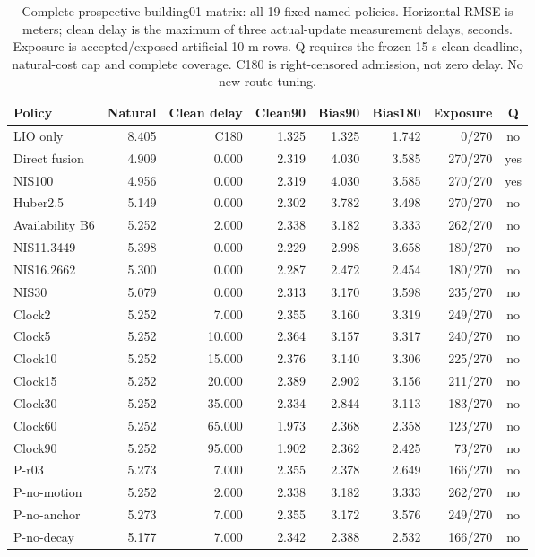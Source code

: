 \begin{table}[t]\centering\small
\caption{Complete prospective building01 matrix: all 19 fixed named policies. Horizontal RMSE is meters; clean delay is the maximum of three actual-update measurement delays, seconds. Exposure is accepted/exposed artificial 10-m rows. Q requires the frozen 15-s clean deadline, natural-cost cap and complete coverage. C180 is right-censored admission, not zero delay. No new-route tuning.}\label{tab:primary}
\begin{tabular}{lrrrrrrc}\toprule
Policy & Natural & Clean delay & Clean90 & Bias90 & Bias180 & Exposure & Q\\\midrule
LIO only & 8.405 & C180 & 1.325 & 1.325 & 1.742 & 0/270 & no \\
Direct fusion & 4.909 & 0.000 & 2.319 & 4.030 & 3.585 & 270/270 & yes \\
NIS100 & 4.956 & 0.000 & 2.319 & 4.030 & 3.585 & 270/270 & yes \\
Huber2.5 & 5.149 & 0.000 & 2.302 & 3.782 & 3.498 & 270/270 & no \\
Availability B6 & 5.252 & 2.000 & 2.338 & 3.182 & 3.333 & 262/270 & no \\
NIS11.3449 & 5.398 & 0.000 & 2.229 & 2.998 & 3.658 & 180/270 & no \\
NIS16.2662 & 5.300 & 0.000 & 2.287 & 2.472 & 2.454 & 180/270 & no \\
NIS30 & 5.079 & 0.000 & 2.313 & 3.170 & 3.598 & 235/270 & no \\
Clock2 & 5.252 & 7.000 & 2.355 & 3.160 & 3.319 & 249/270 & no \\
Clock5 & 5.252 & 10.000 & 2.364 & 3.157 & 3.317 & 240/270 & no \\
Clock10 & 5.252 & 15.000 & 2.376 & 3.140 & 3.306 & 225/270 & no \\
Clock15 & 5.252 & 20.000 & 2.389 & 2.902 & 3.156 & 211/270 & no \\
Clock30 & 5.252 & 35.000 & 2.334 & 2.844 & 3.113 & 183/270 & no \\
Clock60 & 5.252 & 65.000 & 1.973 & 2.368 & 2.358 & 123/270 & no \\
Clock90 & 5.252 & 95.000 & 1.902 & 2.362 & 2.425 & 73/270 & no \\
P-r03 & 5.273 & 7.000 & 2.355 & 2.378 & 2.649 & 166/270 & no \\
P-no-motion & 5.252 & 2.000 & 2.338 & 3.182 & 3.333 & 262/270 & no \\
P-no-anchor & 5.273 & 7.000 & 2.355 & 3.172 & 3.576 & 249/270 & no \\
P-no-decay & 5.177 & 7.000 & 2.342 & 2.388 & 2.532 & 166/270 & no \\
\bottomrule\end{tabular}\end{table}
